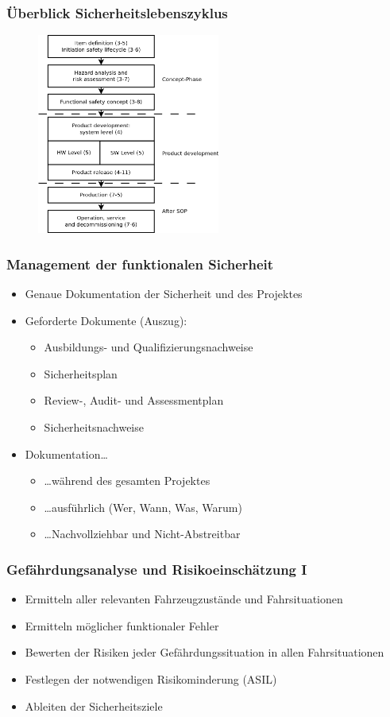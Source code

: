 \documentclass[]{beamer}
\begin{document}
\begin{frame}
\frametitle{Überblick Sicherheitslebenszyklus}
\begin{figure}
   \includegraphics[width=6cm]{Abb_6_1}
\end{figure}
\end{frame}


\begin{frame}
\frametitle{Management der funktionalen Sicherheit}

\begin{itemize}
    \item Genaue Dokumentation der Sicherheit und des Projektes
    \item Geforderte Dokumente (Auszug):
    \begin{itemize}
        \item Ausbildungs- und Qualifizierungsnachweise
        \item Sicherheitsplan
        \item Review-, Audit- und Assessmentplan
        \item Sicherheitsnachweise
    \end{itemize}
    \item Dokumentation\dots
    \begin{itemize}
        \item \dots während des gesamten Projektes
        \item \dots ausführlich (Wer, Wann, Was, Warum)
        \item \dots Nachvollziehbar und Nicht-Abstreitbar
    \end{itemize}
\end{itemize}

\end{frame}

\begin{frame}
\frametitle{Gefährdungsanalyse und Risikoeinschätzung I}

\begin{itemize}
    \item Ermitteln aller relevanten Fahrzeugzustände und Fahrsituationen
    \item Ermitteln möglicher funktionaler Fehler
    \item Bewerten der Risiken jeder Gefährdungssituation in allen Fahrsituationen
    \item Festlegen der notwendigen Risikominderung (ASIL)
    \item Ableiten der Sicherheitsziele
\end{itemize}

\end{frame}
\end{document}
